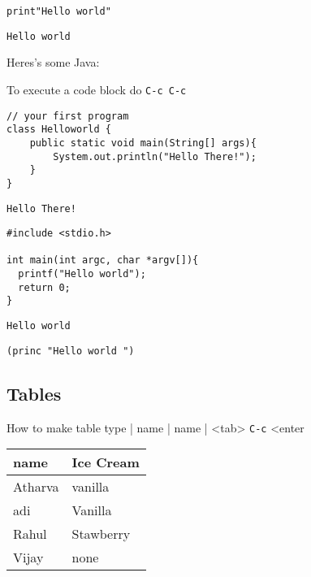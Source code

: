 \documentclass[11pt]{article}
\begin{document}
\begin{verbatim}
print"Hello world"
\end{verbatim}

\begin{verbatim}
Hello world
\end{verbatim}




Heres's some Java:

To execute a code block do \texttt{C-c C-c}

\begin{verbatim}
// your first program
class Helloworld {
    public static void main(String[] args){
        System.out.println("Hello There!");
    }
}
\end{verbatim}

\begin{verbatim}
Hello There!
\end{verbatim}



\begin{verbatim}
#include <stdio.h>

int main(int argc, char *argv[]){
  printf("Hello world");
  return 0;
}
\end{verbatim}

\begin{verbatim}
Hello world
\end{verbatim}



\begin{verbatim}
(princ "Hello world ")
\end{verbatim}

\subsection{Tables}
\label{sec:org83749d3}

How to make table type | name | name | <tab> \texttt{C-c} <enter

\begin{center}
\begin{tabular}{ll}
name & Ice Cream\\
\hline
Atharva & vanilla\\
adi & Vanilla\\
Rahul & Stawberry\\
Vijay & none\\
\end{tabular}
\end{center}
\end{document}
